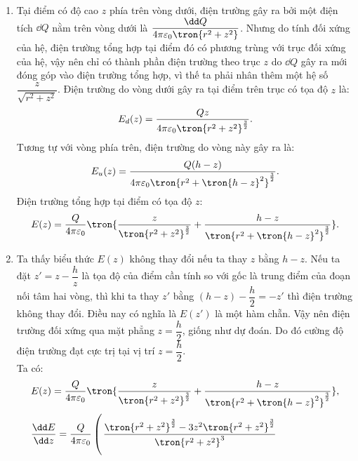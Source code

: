      \begin{loigiai}
        \begin{enumerate}[1)]
        \setlength{\itemsep}{0pt}
            \item Tại điểm có độ cao $z$ phía trên vòng dưới, điện trường gây ra bởi một điện tích $\dd Q$ nằm trên vòng dưới là $\dfrac{\dd Q}{4\pi\varepsilon_0\tron{r^2+z^2}}$. Nhưng do tính đối xứng của hệ, điện trường tổng hợp tại điểm đó có phương trùng với trục đối xứng của hệ, vậy nên chỉ có thành phần điện trường theo trục $z$ do $\dd Q$ gây ra mới đóng góp vào điện trường tổng hợp, vì thế ta phải nhân thêm một hệ số $\dfrac{z}{\sqrt{r^2+z^2}}$. Điện trường do vòng dưới gây ra tại điểm trên trục có tọa độ $z$ là:
            \begin{equation}
                E_d(z)=\dfrac{Qz}{4\pi\varepsilon_0\tron{r^2+z^2}^{\frac{3}{2}}}.
            \end{equation}
            Tương tự với vòng phía trên, điện trường do vòng này gây ra là:
            \begin{equation}
                 E_u(z)=\dfrac{Q(h-z)}{4\pi\varepsilon_0\tron{r^2+\tron{h-z}^2}^{\frac{3}{2}}}.
            \end{equation}
             Điện trường tổng hợp tại điểm có tọa độ $z$:
        \begin{equation}
            E(z)=\dfrac{Q}{4\pi\varepsilon_0}\tron{\dfrac{z}{\tron{r^2+z^2}^{\frac{3}{2}}}+\dfrac{h-z}{\tron{r^2+\tron{h-z}^2}^{\frac{3}{2}}}}.
        \end{equation}
            \item Ta thấy biểu thức $E(z)$ không thay đổi nếu ta thay $z$ bằng $h-z$. Nếu ta đặt $z'=z-\dfrac{h}{z}$ là tọa độ của điểm cần tính so với gốc là trung điểm của đoạn nối tâm hai vòng, thì khi ta thay $z'$ bằng $(h-z)-\dfrac{h}{2}=-z'$ thì điện trường không thay đổi. Điều nay có nghĩa là $E(z')$ là một hàm chẵn. Vậy nên điện trường đối xứng qua mặt phẳng $z=\dfrac{h}{2}$, giống như dự đoán. Do đó cường độ điện trường đạt cực trị tại vị trí $z=\dfrac{h}{2}$. \\
            Ta có:
            \begin{equation}
            \begin{aligned}
               &E(z)=\dfrac{Q}{4\pi\varepsilon_0}\tron{\dfrac{z}{\tron{r^2+z^2}^{\frac{3}{2}}}+\dfrac{h-z}{\tron{r^2+\tron{h-z}^2}^{\frac{3}{2}}}},\\
               &\begin{aligned}
                  \dfrac{\dd E}{\dd z}=\dfrac{Q}{4\pi \varepsilon_0}\left(\rule{0cm}{0.9cm} \right.&\dfrac{\tron{r^2+z^2}^\frac{3}{2}-3z^2\tron{r^2+z^2}^\frac{3}{2}}{\tron{r^2+z^2}^3}\\

\end{aligned}
\end{aligned}
\end{equation}
\end{enumerate}
\end{loigiai}
